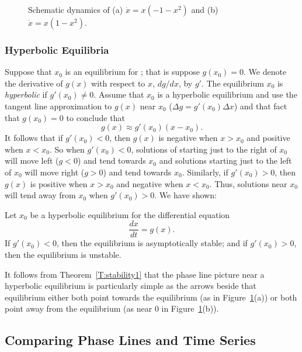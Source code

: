 \begin{figure}[htb]
       \centerline{%
	}
\caption{Schematic dynamics of (a) $\dot{x}=x(-1-x^2)$ and (b) $\dot{x}=x(1-x^2)$.}
\label{pitch3}
\end{figure}

\subsubsection*{Hyperbolic Equilibria}

Suppose that $x_0$ is an equilibrium for ; that is suppose
$g(x_0)=0$.  We denote the derivative of $g(x)$ with respect to $x$, 
$dg/dx$, by $g'$.  The equilibrium $x_0$ is 
{\em hyperbolic\/} 
if $g'(x_0)\neq 0$.  Assume that $x_0$ is a hyperbolic equilibrium and use
the tangent line approximation to $g(x)$ near $x_0$
($\Delta g = g'(x_0)\Delta x$) and that fact that $g(x_0)=0$ to conclude that
\[
g(x) \approx g'(x_0)(x-x_0).
\]
It follows that if $g'(x_0)<0$, then $g(x)$ is negative when
$x>x_0$ and positive when $x<x_0$.  So when $g'(x_0)<0$,
solutions of  starting just to the right of $x_0$ will
move left ($g<0$) and tend towards $x_0$ and solutions starting
just to the left of $x_0$ will move right ($g>0$) and tend
towards $x_0$.  Similarly, if $g'(x_0)>0$, then $g(x)$ is positive
when $x>x_0$ and negative when $x<x_0$.  Thus, solutions near $x_0$ 
will tend away from $x_0$ when $g'(x_0)>0$.    We  have shown:
\begin{thm} \label{T:stability1}
Let $x_0$ be a hyperbolic equilibrium for the differential equation
\[
\frac{dx}{dt} = g(x).
\]
If $g'(x_0)<0$, then the equilibrium is asymptotically stable;
and if $g'(x_0)>0$, then the equilibrium is unstable.
\end{thm}  

It follows from Theorem~\ref{T:stability1} that the phase line picture
near a hyperbolic equilibrium is particularly simple as the arrows beside
that equilibrium either both point towards the equilibrium (as in
Figure~\ref{pitch3}(a)) or both point away from the equilibrium (as near $0$
in Figure~\ref{pitch3}(b)).

\subsection*{Comparing Phase Lines and Time Series}

